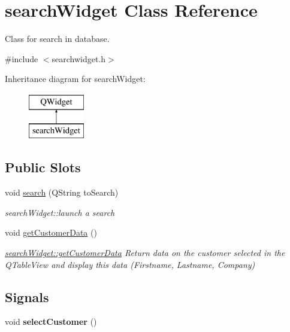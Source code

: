 \hypertarget{classsearchWidget}{\section{search\+Widget Class Reference}
\label{classsearchWidget}
}


Class for search in database.  




{\ttfamily \#include $<$searchwidget.\+h$>$}

Inheritance diagram for search\+Widget\+:\begin{figure}[H]
\begin{center}
\leavevmode
\includegraphics[height=2.000000cm]{d2/dfd/classsearchWidget}
\end{center}
\end{figure}
\subsection*{Public Slots}
\begin{DoxyCompactItemize}
\item 
void \hyperlink{classsearchWidget_a15138eab0d8098a21c327bd34e328541}{search} (Q\+String to\+Search)
\begin{DoxyCompactList}\small\item\em search\+Widget\+::launch a search \end{DoxyCompactList}\item 
\hypertarget{classsearchWidget_a09e08e9768fbb579c065bcff0d47c2ac}{void \hyperlink{classsearchWidget_a09e08e9768fbb579c065bcff0d47c2ac}{get\+Customer\+Data} ()}\label{classsearchWidget_a09e08e9768fbb579c065bcff0d47c2ac}

\begin{DoxyCompactList}\small\item\em \hyperlink{classsearchWidget_a09e08e9768fbb579c065bcff0d47c2ac}{search\+Widget\+::get\+Customer\+Data} Return data on the customer selected in the Q\+Table\+View and display this data (Firstname, Lastname, Company) \end{DoxyCompactList}\end{DoxyCompactItemize}
\subsection*{Signals}
\begin{DoxyCompactItemize}
\item 
\hypertarget{classsearchWidget_a5eed5229b7aeb5de25d4892a8055d070}{void {\bfseries select\+Customer} ()}\label{classsearchWidget_a5eed5229b7aeb5de25d4892a8055d070}

\end{DoxyCompactItemize}
